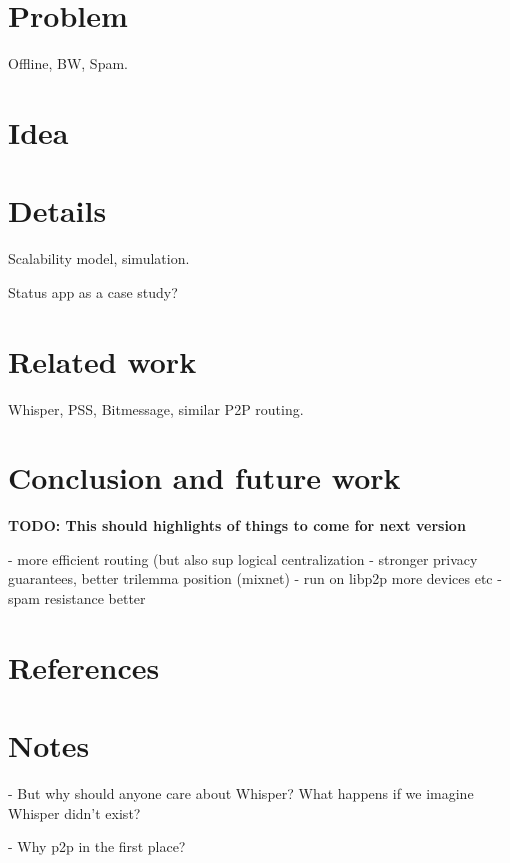 \documentclass[12pt]{article}
\begin{document}
\section{Problem}
Offline, BW, Spam.

\section{Idea}
\section{Details}
Scalability model, simulation.

Status app as a case study?

\section{Related work}
Whisper, PSS, Bitmessage, similar P2P routing.
\section{Conclusion and future work}

\textbf{TODO: This should highlights of things to come for next version}

- more efficient routing (but also sup logical centralization
- stronger privacy guarantees, better trilemma position (mixnet)
- run on libp2p more devices etc
- spam resistance better


\section{References}
\section{Notes}

- But why should anyone care about Whisper? What happens if we imagine Whisper didn't exist?

- Why p2p in the first place?
\end{document}
